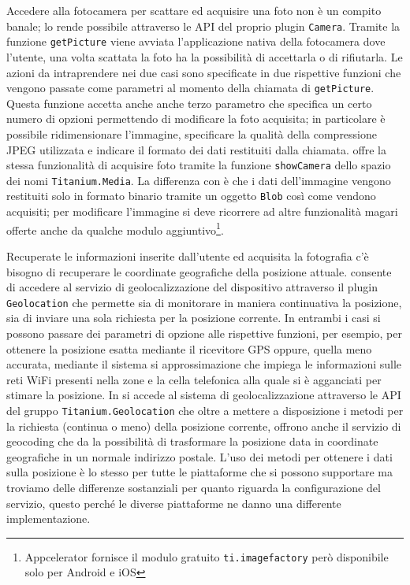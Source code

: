 			Accedere alla fotocamera per scattare ed acquisire una foto non è un 
			compito banale; \pg{} lo rende possibile attraverso le API del
			proprio plugin \texttt{Camera}. Tramite la funzione
			\texttt{getPicture} viene avviata l'applicazione nativa della
			fotocamera dove l'utente, una volta scattata la foto ha la
			possibilità di accettarla o di rifiutarla. Le azioni da
			intraprendere nei due casi sono specificate in due rispettive
			funzioni \js{} che vengono passate come parametri al momento della
			chiamata di	\texttt{getPicture}. Questa funzione accetta anche
			anche terzo parametro che specifica un certo numero di opzioni
			permettendo di modificare la foto acquisita; in particolare è
			possibile ridimensionare l'immagine, specificare la qualità della
			compressione JPEG utilizzata e indicare il formato dei dati
			restituiti dalla chiamata. \tisdk{} offre la stessa funzionalità di
			acquisire foto tramite la funzione \texttt{showCamera} dello spazio
			dei nomi \texttt{Titanium.Media}. La differenza con \pg{} è che i
			dati dell'immagine vengono restituiti solo in formato binario
			tramite un oggetto \js{} \texttt{Blob} così come vendono acquisiti;
			per modificare l'immagine si deve ricorrere ad altre funzionalità
			magari offerte anche da qualche modulo aggiuntivo\footnote{Appcelerator
			fornisce il modulo gratuito \texttt{ti.imagefactory} però
			disponibile solo per Android e iOS}.
			
			Recuperate le informazioni inserite dall'utente ed acquisita la
			fotografia c'è bisogno di recuperare le coordinate geografiche della
			posizione attuale. \pg{} consente di accedere al servizio di
			geolocalizzazione del dispositivo attraverso il plugin
			\texttt{Geolocation} che permette sia di monitorare in maniera
			continuativa la posizione, sia di inviare una sola richiesta per la
			posizione corrente. In entrambi i casi si possono passare dei
			parametri di opzione alle rispettive funzioni, per esempio, per
			ottenere la posizione esatta mediante il ricevitore GPS oppure,
			quella meno accurata, mediante il sistema si approssimazione che
			impiega le informazioni sulle reti WiFi presenti nella zone e la
			cella telefonica alla quale si è agganciati per stimare la
			posizione. In \tisdk{} si accede al sistema di
			geolocalizzazione attraverso le API del gruppo
			\texttt{Titanium.Geolocation} che oltre a mettere a disposizione i
			metodi per la richiesta (continua o meno) della posizione corrente,
			offrono anche il servizio di geocoding che da la possibilità di
			trasformare la posizione data in coordinate geografiche in un
			normale indirizzo postale. L'uso dei metodi per ottenere i dati
			sulla posizione è lo stesso per tutte le piattaforme che si possono
			supportare ma troviamo delle differenze sostanziali per quanto
			riguarda la configurazione del servizio, questo perché le diverse
			piattaforme ne danno una differente implementazione.
			
